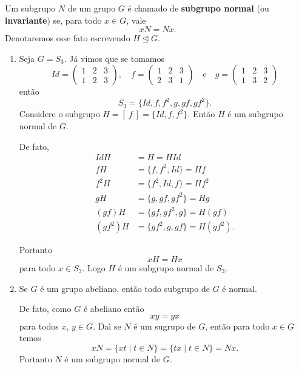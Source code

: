 \begin{definicao}
    Um subgrupo $N$ de um grupo $G$ \'e chamado de \textbf{subgrupo normal} (ou \textbf{invariante}) se, para todo $x \in G$, vale
    \[
        xN = Nx.
    \]
    Denotaremos esse fato escrevendo $H \unlhd G$.
\end{definicao}

\begin{exemplos}
    \begin{enumerate}[label={\arabic*})]
        \item Seja $G = S_3$. J\'a vimos que se tomamos
        \[
            Id = \begin{pmatrix}
                1 & 2 & 3\\
                1 & 2 & 3
            \end{pmatrix}, \quad
            f = \begin{pmatrix}
                1 & 2 & 3\\
                2 & 3 & 1
            \end{pmatrix} \quad \mbox{e}\quad
            g = \begin{pmatrix}
                1 & 2 & 3\\
                1 & 3 & 2
            \end{pmatrix}
        \]
        ent\~ao
        \[
            S_3 = \{Id, f, f^2, g, gf, gf^2\}.
        \]
        Considere o subgrupo $H = [\ f\ ] = \{Id, f, f^2\}$. Ent\~ao $H$ \'e um subgrupo normal de $G$.
        \begin{solucao}
            De fato,
            \begin{align*}
                IdH &= H = HId\\
                fH &= \{f, f^2, Id\} = Hf\\
                f^2H &= \{f^2, Id, f\} = Hf^2\\
                gH &= \{g, gf, gf^2\} = Hg\\
                (gf)H &= \{gf, gf^2, g\} = H(gf)\\
                (gf^2)H &= \{gf^2, g, gf\} = H(gf^2).
            \end{align*}

            Portanto
            \[
                xH = Hx
            \]
            para todo $x \in S_3$. Logo $H$ \'e um subgrupo normal de $S_3$.
        \end{solucao}

        \item Se $G$ \'e um grupo abeliano, ent\~ao todo subgrupo de $G$ \'e normal.
        \begin{solucao}
            De fato, como $G$ \'e abeliano ent\~ao
            \[
                xy = yx
            \]
            para todos $x$, $y \in G$. Da{\'\i} se $N$ \'e um sugrupo de $G$, ent\~ao para todo $x \in G$ temos
            \[
                xN = \{xt \mid t \in N\} = \{tx \mid t \in N\} = Nx.
            \]
            Portanto $N$ \'e um subgrupo normal de $G$.
        \end{solucao}


\end{enumerate}
\end{exemplos}
